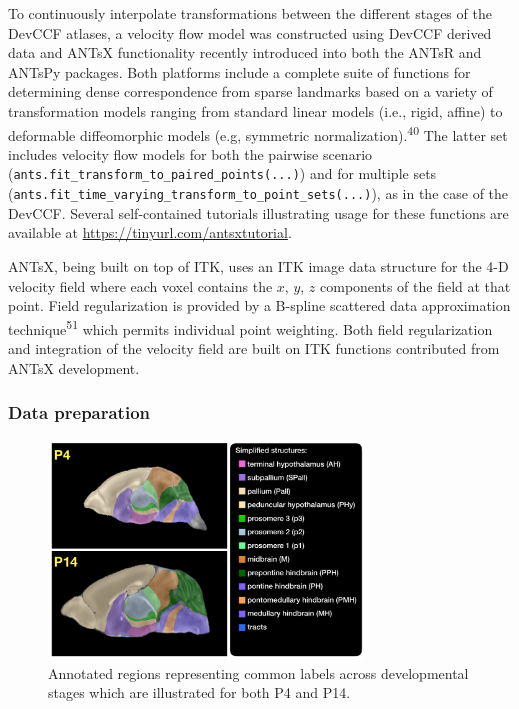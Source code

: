 \documentclass[
  12pt,
]{article}
\begin{document}
To continuously interpolate transformations between the different stages
of the DevCCF atlases, a velocity flow model was constructed using
DevCCF derived data and ANTsX functionality recently introduced into
both the ANTsR and ANTsPy packages. Both platforms include a complete
suite of functions for determining dense correspondence from sparse
landmarks based on a variety of transformation models ranging from
standard linear models (i.e., rigid, affine) to deformable diffeomorphic
models (e.g, symmetric normalization).\textsuperscript{40} The latter
set includes velocity flow models for both the pairwise scenario
(\texttt{ants.fit\_transform\_to\_paired\_points(...)}) and for multiple
sets
(\texttt{ants.fit\_time\_varying\_transform\_to\_point\_sets(...)}), as
in the case of the DevCCF. Several self-contained tutorials illustrating
usage for these functions are available at
\url{https://tinyurl.com/antsxtutorial}.

ANTsX, being built on top of ITK, uses an ITK image data structure for
the 4-D velocity field where each voxel contains the \(x\), \(y\), \(z\)
components of the field at that point. Field regularization is provided
by a B-spline scattered data approximation technique\textsuperscript{51}
which permits individual point weighting. Both field regularization and
integration of the velocity field are built on ITK functions contributed
from ANTsX development.

\hypertarget{data-preparation}{%
\subsubsection{Data preparation}\label{data-preparation}}

\begin{figure}[!htb]
\centering
\includegraphics[width=0.75\textwidth]{Figures/SimplifiedAnnotations.pdf}
\caption{Annotated regions representing common labels across developmental stages which
are illustrated for both P4 and P14.}
\label{fig:simplifiedannotations}
\end{figure}
\end{document}
